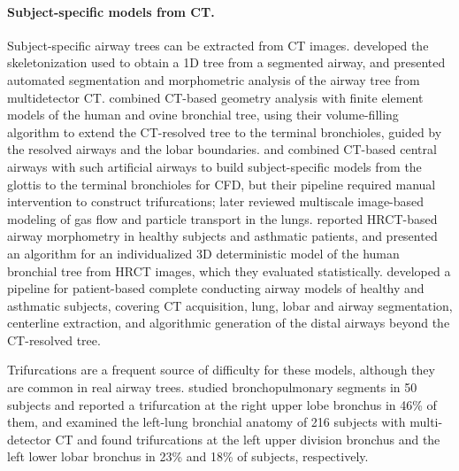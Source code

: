 \paragraph{Subject-specific models from CT.}  %
Subject-specific airway trees can be extracted from CT images. \citet{palagyi2006} developed
the skeletonization used to obtain a 1D tree from a segmented airway, and
\citet{nakamura2008} presented automated segmentation and morphometric analysis of the airway
tree from multidetector CT. \citet{tawhai2004} combined CT-based geometry analysis with finite
element models of the human and ovine bronchial tree, using their volume-filling algorithm to
extend the CT-resolved tree to the terminal bronchioles, guided by the resolved airways and
the lobar boundaries. \citet{lin2009} and \citet{tawhai2009} combined CT-based central airways
with such artificial airways to build subject-specific models from the glottis to the
terminal bronchioles for CFD, but their pipeline required manual intervention to construct
trifurcations; \citet{lin2013} later reviewed multiscale image-based modeling of gas flow and
particle transport in the lungs. \citet{montesantos2013} reported HRCT-based airway
morphometry in healthy subjects and asthmatic patients, and \citet{montesantos2016} presented
an algorithm for an individualized 3D deterministic model of the human bronchial tree from
HRCT images, which they evaluated statistically. \citet{bordas2015} developed a pipeline for
patient-based complete conducting airway models of healthy and asthmatic subjects, covering
CT acquisition, lung, lobar and airway segmentation, centerline extraction, and algorithmic
generation of the distal airways beyond the CT-resolved tree.

Trifurcations are a frequent source of difficulty for these models, although they are common
in real airway trees. \citet{boyden1949} studied bronchopulmonary segments in 50 subjects and
reported a trifurcation at the right upper lobe bronchus in 46\% of them, and
\citet{zhao2009} examined the left-lung bronchial anatomy of 216 subjects with multi-detector
CT and found trifurcations at the left upper division bronchus and the left lower lobar
bronchus in 23\% and 18\% of subjects, respectively.

